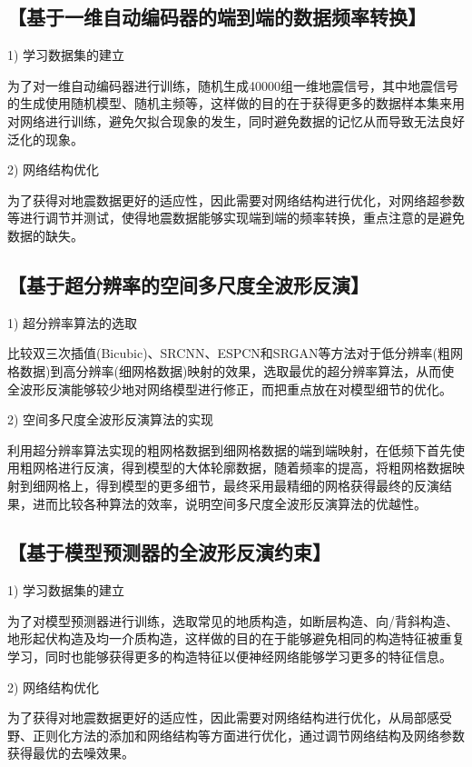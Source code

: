 \documentclass[11pt]{article}
\newcommand{\kai}{\CJKfamily{kai}}
\begin{document}
\subsection*{\kai\fontsize{11pt}{10pt} \selectfont【基于一维自动编码器的端到端的数据频率转换】}
1) 学习数据集的建立
\par
为了对一维自动编码器进行训练，随机生成40000组一维地震信号，其中地震信号的生成使用随机模型、随机主频等，这样做的目的在于获得更多的数据样本集来用对网络进行训练，避免欠拟合现象的发生，同时避免数据的记忆从而导致无法良好泛化的现象。
\par
2) 网络结构优化
\par
为了获得对地震数据更好的适应性，因此需要对网络结构进行优化，对网络超参数等进行调节并测试，使得地震数据能够实现端到端的频率转换，重点注意的是避免数据的缺失。

\subsection*{\kai\fontsize{11pt}{10pt} \selectfont【基于超分辨率的空间多尺度全波形反演】}
1) 超分辨率算法的选取
\par
比较双三次插值(Bicubic)、SRCNN、ESPCN和SRGAN等方法对于低分辨率(粗网格数据)到高分辨率(细网格数据)映射的效果，选取最优的超分辨率算法，从而使全波形反演能够较少地对网络模型进行修正，而把重点放在对模型细节的优化。
\par
2) 空间多尺度全波形反演算法的实现
\par
利用超分辨率算法实现的粗网格数据到细网格数据的端到端映射，在低频下首先使用粗网格进行反演，得到模型的大体轮廓数据，随着频率的提高，将粗网格数据映射到细网格上，得到模型的更多细节，最终采用最精细的网格获得最终的反演结果，进而比较各种算法的效率，说明空间多尺度全波形反演算法的优越性。

\subsection*{\kai\fontsize{11pt}{10pt} \selectfont【基于模型预测器的全波形反演约束】}
1) 学习数据集的建立
\par
为了对模型预测器进行训练，选取常见的地质构造，如断层构造、向/背斜构造、地形起伏构造及均一介质构造，这样做的目的在于能够避免相同的构造特征被重复学习，同时也能够获得更多的构造特征以便神经网络能够学习更多的特征信息。
\par
2) 网络结构优化
\par
为了获得对地震数据更好的适应性，因此需要对网络结构进行优化，从局部感受野、正则化方法的添加和网络结构等方面进行优化，通过调节网络结构及网络参数获得最优的去噪效果。
\par
\newpage
\end{document}
